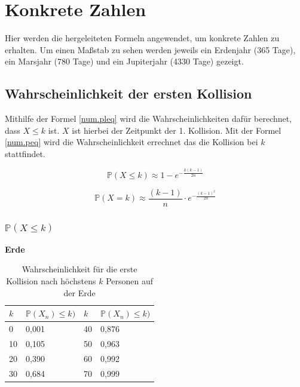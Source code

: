 \documentclass[../main.tex]{subfiles}
\begin{document}
    \section{Konkrete Zahlen}
    Hier werden die hergeleiteten Formeln angewendet, um konkrete Zahlen zu erhalten.
    Um einen Maßstab zu sehen werden jeweils ein Erdenjahr (365 Tage), ein Marsjahr (780 Tage) und ein Jupiterjahr (4330 Tage) gezeigt.

    \subsection{Wahrscheinlichkeit der ersten Kollision}

    Mithilfe der Formel \ref{num.pleq} wird die Wahrscheinlichkeiten dafür berechnet, dass $X \leq k$ ist. $X$ ist hierbei der
    Zeitpunkt der 1. Kollision.
    Mit der Formel \ref{num.peq} wird die Wahrscheinlichkeit errechnet das die Kollision bei $k$ stattfindet.

    \begin{equation}
        \mathbb{P}(X \leq k) \approx 1 - e^{- \frac{k(k-1)}{2n}}
        \label{num.pleq}
    \end{equation}

    \begin{equation}
        \mathbb{P}(X = k) \approx \frac{(k-1)}{n} \cdot e^{- \frac{(k-1)^2}{2n}}
        \label{num.peq}
    \end{equation}

    \subsubsection{$\mathbb{P}(X \leq k)$}

    \textbf{Erde}

    \begin{table}[h]
        \centering
        \begin{tabular}{|l|l|l|l|}
            \hline
            $k$ & $\mathbb{P}(X_{n}) \leq k)$ & $k$ & $\mathbb{P}(X_{n}) \leq k)$ \\ \hline
            0   & 0,001                       & 40  & 0,876                       \\
            10  & 0,105                       & 50  & 0,963                       \\
            20  & 0,390                       & 60  & 0,992                       \\
            30  & 0,684                       & 70  & 0,999                       \\ \hline
        \end{tabular}
        \caption{\label{num.tpe} Wahrscheinlichkeit für die erste Kollision nach höchstens $k$ Personen auf der Erde}
    \end{table}
\end{document}
